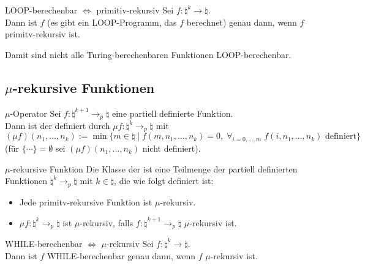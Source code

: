 \begin{Satz}{LOOP-berechenbar $\iff$ primitiv-rekursiv}
    Sei $f\colon \natural^k \rightarrow \natural$.\\
    Dann ist $f$  (es gibt ein LOOP-Programm, das $f$ berechnet)
    genau dann, wenn $f$ primitv-rekursiv ist.
\end{Satz}

\begin{Bem}
    Damit sind nicht alle Turing-berechenbaren Funktionen LOOP-berechenbar.
\end{Bem}

\subsection{%
    \texorpdfstring{$\mu$}{µ}-rekursive Funktionen%
}

\begin{Def}{$\mu$-Operator}
    Sei $f\colon \natural^{k+1} \rightarrow_p \natural$ eine partiell definierte Funktion.\\
    Dann ist der  definiert durch
    $\mu f\colon \natural^k \rightarrow_p \natural$ mit\\
    $(\mu f)(n_1, \dotsc, n_k) := \min\{m \in \natural \;|\; f(m, n_1, \dotsc, n_k) = 0,\;
    \forall_{i = 0, \dotsc, m}\; f(i, n_1, \dotsc, n_k) \text{ definiert}\}$\\
    (für $\{\dotsb\} = \emptyset$ sei $(\mu f)(n_1, \dotsc, n_k)$ nicht definiert).
\end{Def}

\begin{Def}{$\mu$-rekursive Funktion}
    Die Klasse der  ist eine Teilmenge der partiell
    definierten Funktionen $\natural^k \rightarrow_p \natural$ mit $k \in \natural$,
    die wie folgt definiert ist:
    \begin{itemize}
        \item
        Jede primitv-rekursive Funktion ist $\mu$-rekursiv.
        
        \item
        $\mu f\colon \natural^k \rightarrow_p \natural$ ist $\mu$-rekursiv,
        falls $f\colon \natural^{k+1} \rightarrow_p \natural$ $\mu$-rekursiv ist.
    \end{itemize}
\end{Def}

\begin{Satz}{WHILE-berechenbar $\iff$ $\mu$-rekursiv}
    Sei $f\colon \natural^k \rightarrow \natural$.\\
    Dann ist $f$ WHILE-berechenbar genau dann, wenn $f$ $\mu$-rekursiv ist.
\end{Satz}

